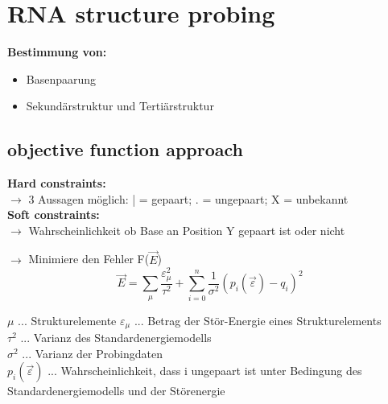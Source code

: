 \section{RNA structure probing}
\textbf{Bestimmung von:}
\begin{itemize}
\item Basenpaarung
\item Sekundärstruktur und Tertiärstruktur
\end{itemize}

\subsection{objective function approach}
\textbf{Hard constraints:} \\
$\rightarrow$ 3 Aussagen möglich: | = gepaart; . = ungepaart; X = unbekannt \\
\textbf{Soft constraints:} \\ 
$\rightarrow$ Wahrscheinlichkeit ob Base an Position Y gepaart ist oder nicht 

$\rightarrow$ Minimiere den Fehler F($\vec{E}$) \\
\begin{equation}
\vec{E} = \sum_{\mu} \dfrac{\varepsilon_{\mu}^{2}}{\tau^2} + \sum_{i = 0}^{n} \dfrac{1}{\sigma^2}(p_i(\vec{\varepsilon}) -q_i)^2
\end{equation} 

$\mu$ ... Strukturelemente
$\varepsilon_{\mu}$ ... Betrag der Stör-Energie eines Strukturelements\\
$\tau^2$ ... Varianz des Standardenergiemodells \\
$\sigma^2$ ... Varianz der Probingdaten \\
$p_i(\vec{\varepsilon})$ ... Wahrscheinlichkeit, dass i ungepaart ist unter Bedingung des Standardenergiemodells und der Störenergie

